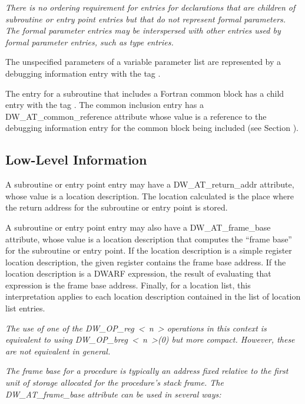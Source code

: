 \textit{There is no ordering requirement for entries for declarations
that are children of subroutine or entry point entries but
that do not represent formal parameters. The formal parameter
entries may be interspersed with other entries used by formal
parameter entries, such as type entries.}

The unspecified parameters of a variable parameter list are
represented by a debugging information entry with the tag
.

The entry for a subroutine that includes a Fortran common block
has a child entry with the 
tag . 
The
common inclusion entry has a 
DW\-\_AT\-\_common\-\_reference attribute
whose value is a reference to the debugging information entry
for the common block being included 
(see Section ).

\subsection{Low-Level Information}
\label{chap:lowlevelinformation}

A subroutine or entry point entry may have a DW\_AT\_return\_addr
attribute, whose value is a location description. The location
calculated is the place where the return address for the
subroutine or entry point is stored.

A subroutine or entry point entry may also have a
DW\_AT\_frame\_base attribute, whose value is a location
description that computes the “frame base” for the
subroutine or entry point. If the location description is
a simple register location description, the given register
contains the frame base address. If the location description is
a DWARF expression, the result of evaluating that expression
is the frame base address. Finally, for a location list,
this interpretation applies to each location description
contained in the list of location list entries.

\textit{The use of one of the DW\_OP\_reg~\textless~n~\textgreater 
operations in this
context is equivalent to using 
DW\_OP\_breg~\textless~n~\textgreater(0) 
but more
compact. However, these are not equivalent in general.}

\textit{The frame base for a procedure is typically an address fixed
relative to the first unit of storage allocated for the
procedure’s stack frame. The DW\_AT\_frame\_base attribute
can be used in several ways:}

